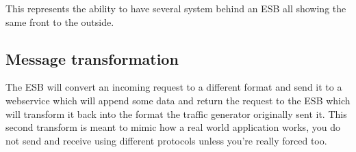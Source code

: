 \documentclass[11pt]{article} %
\begin{document}
This represents the ability to have several system behind an ESB all showing the same front to the outside.
\subsection{Message transformation}
The ESB will convert an incoming request to a different format and send it to a webservice which will append some data and return the request to the ESB which will transform it back into the format the traffic generator originally sent it. This second transform is meant to mimic how a real world application works, you do not send and receive using different protocols unless you're really forced too. 
\end{document}
